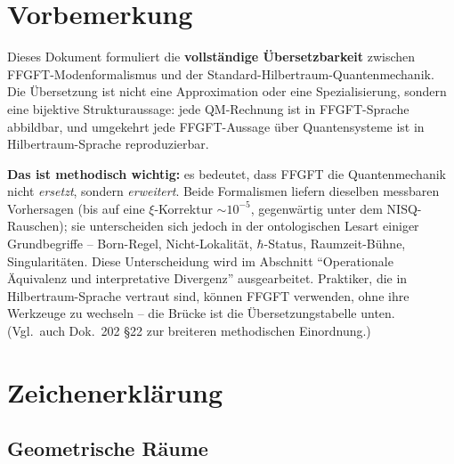 
\section*{Vorbemerkung}

Dieses Dokument formuliert die \textbf{vollständige Übersetzbarkeit}
zwischen FFGFT-Modenformalismus und der Standard-Hilbertraum-Quanten\-mechanik.
Die Übersetzung ist nicht eine Approximation oder eine Spezialisierung,
sondern eine bijektive Strukturaussage: jede QM-Rechnung ist in
FFGFT-Sprache abbildbar, und umgekehrt jede FFGFT-Aussage über
Quantensysteme ist in Hilbertraum-Sprache reproduzierbar.

\textbf{Das ist methodisch wichtig:} es bedeutet, dass FFGFT die
Quantenmechanik nicht \emph{ersetzt}, sondern \emph{erweitert}. Beide
Formalismen liefern dieselben messbaren Vorhersagen (bis auf eine
$\xi$-Korrektur $\sim 10^{-5}$, gegenwärtig unter dem NISQ-Rauschen);
sie unterscheiden sich jedoch in der ontologischen Lesart einiger
Grundbegriffe -- Born-Regel, Nicht-Lokalität, $\hbar$-Status,
Raumzeit-Bühne, Singularitäten. Diese Unterscheidung wird im Abschnitt
\enquote{Operationale Äquivalenz und interpretative Divergenz}
ausgearbeitet. Praktiker, die in Hilbertraum-Sprache vertraut sind,
können FFGFT verwenden, ohne ihre Werkzeuge zu wechseln -- die Brücke
ist die Übersetzungstabelle unten. (Vgl.\ auch Dok.~202 §22 zur
breiteren methodischen Einordnung.)

\section*{Zeichenerklärung}

\subsection*{Geometrische Räume}

